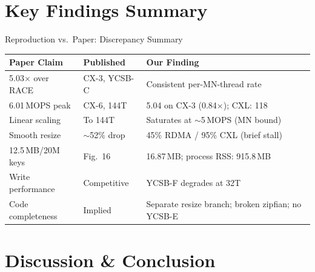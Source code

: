 \documentclass[aspectratio=169]{beamer}
\begin{document}
\section{Key Findings Summary}

\begin{frame}{Reproduction vs.\ Paper: Discrepancy Summary}
\centering
\small
\begin{tabular}{@{}p{3cm}p{3cm}p{5.5cm}@{}}
\toprule
\textbf{Paper Claim} & \textbf{Published} & \textbf{Our Finding} \\
\midrule
5.03$\times$ over RACE & CX-3, YCSB-C & Consistent per-MN-thread rate \\
6.01\,MOPS peak & CX-6, 144T & 5.04 on CX-3 (0.84$\times$); CXL: 118 \\
Linear scaling & To 144T & Saturates at $\sim$5\,MOPS (MN bound) \\
Smooth resize & $\sim$52\% drop & 45\% RDMA / 95\% CXL (brief stall) \\
12.5\,MB/20M keys & Fig.~16 & 16.87\,MB; process RSS: 915.8\,MB \\
Write performance & Competitive & YCSB-F degrades at 32T \\
Code completeness & Implied & Separate resize branch; broken zipfian; no YCSB-E \\
\bottomrule
\end{tabular}
\end{frame}

\section{Discussion \& Conclusion}
\end{document}
